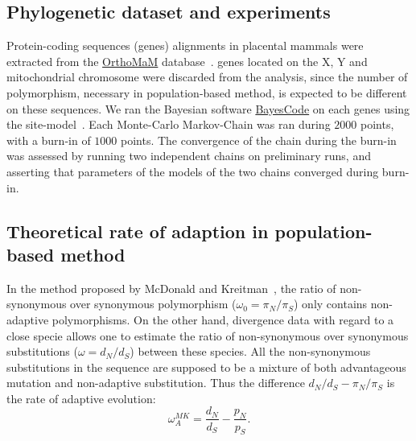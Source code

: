 \documentclass{article}
\newcommand{\dn}{d_N}
\newcommand{\ds}{d_S}
\newcommand{\dnds}{\dn / \ds}
\newcommand{\pn}{\pi_N}
\newcommand{\ps}{\pi_S}
\newcommand{\pnps}{\pn / \ps}
\begin{document}
\subsection*{Phylogenetic dataset and experiments}
Protein-coding sequences (genes) alignments in placental mammals were extracted from the \href{http://www.orthomam.univ-montp2.fr}{OrthoMaM} database~\citep{ranwez_orthomam_2007, douzery_orthomam_2014, scornavacca_orthomam_2019}.
genes located on the X, Y and mitochondrial chromosome were discarded from the analysis, since the number of polymorphism, necessary in population-based method, is expected to be different on these sequences.
We ran the Bayesian software \href{https://github.com/bayesiancook/bayescode}{BayesCode} on each genes using the site-model~\citep{lartillot_phylobayes_2013, rodrigue_detecting_2016}.
Each Monte-Carlo Markov-Chain was ran during $2000$ points, with a burn-in of $1000$ points.
The convergence of the chain during the burn-in was assessed by running two independent chains on preliminary runs, and asserting that parameters of the models of the two chains converged during burn-in.

\subsection*{Theoretical rate of adaption in population-based method}
In the method proposed by McDonald and Kreitman~\citep{mcdonald_adaptative_1991}, the ratio of non-synonymous over synonymous polymorphism ($\omega_{0}=\pnps$) only contains non-adaptive polymorphisms.
On the other hand, divergence data with regard to a close specie allows one to estimate the ratio of non-synonymous over synonymous substitutions ($\omega=\dnds$) between these species.
All the non-synonymous substitutions in the sequence are supposed to be a mixture of both advantageous mutation and non-adaptive substitution.
Thus the difference $\dnds - \pnps$ is the rate of adaptive evolution:
\begin{equation*}
	\omega_A^{MK}=\dfrac{d_N}{d_S} - \dfrac{p_N}{p_S}.
\end{equation*}
\end{document}
